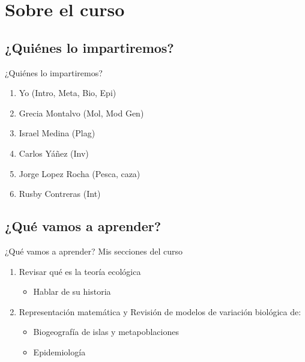 \documentclass[
  11pt,
  ignorenonframetext,
]{beamer}
\providecommand{\tightlist}{%
  \setlength{\itemsep}{0pt}\setlength{\parskip}{0pt}}
\begin{document}
\hypertarget{sobre-el-curso}{%
\section{Sobre el curso}\label{sobre-el-curso}}

\hypertarget{quiuxe9nes-lo-impartiremos}{%
\subsection{¿Quiénes lo
impartiremos?}\label{quiuxe9nes-lo-impartiremos}}

\begin{frame}{¿Quiénes lo impartiremos?}
\begin{enumerate}
\item
  Yo (Intro, Meta, Bio, Epi)
\item
  Grecia Montalvo (Mol, Mod Gen)
\item
  Israel Medina (Plag)
\item
  Carlos Yáñez (Inv)
\item
  Jorge Lopez Rocha (Pesca, caza)
\item
  Rusby Contreras (Int)
\end{enumerate}
\end{frame}

\hypertarget{quuxe9-vamos-a-aprender}{%
\subsection{¿Qué vamos a aprender?}\label{quuxe9-vamos-a-aprender}}

\begin{frame}{¿Qué vamos a aprender?}
Mis secciones del curso

\begin{enumerate}
\item
  Revisar qué es la teoría ecológica

  \begin{itemize}
  \tightlist
  \item
    Hablar de su historia
  \end{itemize}
\item
  Representación matemática y Revisión de modelos de variación biológica
  de:

  \begin{itemize}
  \item
    Biogeografía de islas y metapoblaciones
  \item
    Epidemiología
  \end{itemize}
\end{enumerate}
\end{frame}
\end{document}
